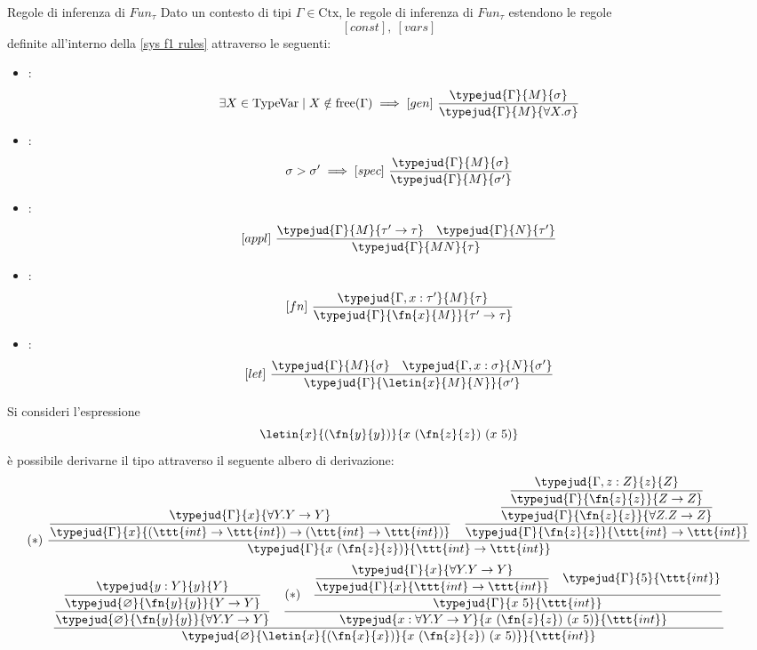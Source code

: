 \documentclass[a4paper, 12pt]{report}
\begin{document}
    \begin{framedprop}[breakable]{Regole di inferenza di $Fun_\tau$}
        Dato un contesto di tipi $\Gamma \in \mathrm{Ctx}$, le regole di inferenza di $Fun_\tau$ estendono le regole $$[const], \ [vars]$$ definite all'interno della \cref{sys f1 rules} attraverso le seguenti:

        \begin{itemize}
            \item {}: $$\exists X \in \mathrm{TypeVar} \mid X \notin \mathrm{free}(\Gamma) \implies [gen] \ \dfrac{\typejud{\Gamma}{M}{\sigma}}{\typejud{\Gamma}{M}{\forall X.\sigma}}$$
            \item {}: $$\sigma > \sigma ' \implies [spec] \ \dfrac{\typejud{\Gamma}{M}{\sigma}}{\typejud{\Gamma}{M}{\sigma'}}$$
            \item {}: $$[appl] \ \dfrac{\typejud{\Gamma}{M}{\tau' \to \tau} \quad \typejud{\Gamma}{N}{\tau'}}{\typejud{\Gamma}{MN}{\tau}}$$
            \item {}: $$[fn] \ \dfrac{\typejud{\Gamma,x:\tau'}{M}{\tau}}{\typejud{\Gamma}{\fn{x}{M}}{\tau' \to \tau}}$$
            \item {}: $$[let] \ \dfrac{\typejud{\Gamma}{M}{\sigma} \quad \typejud{\Gamma, x:\sigma}{N}{\sigma'}}{\typejud{\Gamma}{\letin{x}{M}{N}}{\sigma'}}$$
        \end{itemize}
    \end{framedprop}

    \begin{example}
        Si consideri l'espressione $$\letin{x}{(\fn{y}{y})}{x \ (\fn{z}{z}) \ (x \ 5)}$$ è possibile derivarne il tipo attraverso il seguente albero di derivazione: $$(*) \ \dfrac{\dfrac{\typejud{\Gamma}{x}{\forall Y . Y \to Y}}{\typejud{\Gamma}{x}{(\ttt{int} \to \ttt{int}) \to (\ttt{int} \to \ttt{int})}} \quad \dfrac{\dfrac{\dfrac{\typejud{\Gamma, z:Z}{z}{Z}}{\typejud{\Gamma}{\fn{z}{z}}{Z \to Z}}}{\typejud{\Gamma}{\fn{z}{z}}{\forall Z . Z \to Z}}}{\typejud{\Gamma}{\fn{z}{z}}{\ttt{int} \to \ttt{int}}}}{\typejud{\Gamma}{x \ (\fn{z}{z})}{\ttt{int} \to \ttt{int}}}$$ $$\dfrac{\dfrac{\dfrac{\typejud{y:Y}{y}{Y}}{\typejud{\varnothing}{\fn{y}{y}}{Y \to Y}}}{\typejud{\varnothing}{\fn{y}{y}}{\forall Y.Y \to Y}} \quad \dfrac{(*) \quad \dfrac{\dfrac{\typejud{\Gamma}{x}{\forall Y.Y \to Y}}{\typejud{\Gamma}{x}{\ttt{int} \to \ttt{int}}} \quad \typejud{\Gamma}{5}{\ttt{int}}}{\typejud{\Gamma}{x \ 5}{\ttt{int}}}}{\typejud{x: \forall Y .Y \to Y}{x \ (\fn{z}{z}) \ (x \ 5)}{\ttt{int}}}}{\typejud{\varnothing}{\letin{x}{(\fn{x}{x})}{x \ (\fn{z}{z}) \ (x \ 5)}}{\ttt{int}}}$$
    \end{example}
\end{document}
